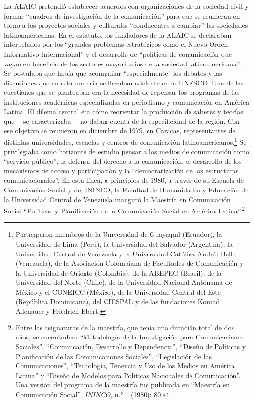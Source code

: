 \documentclass{tufte-handout}
\begin{document}
La ALAIC pretendió establecer acuerdos con organizaciones de la sociedad
civil y formar ``cuadros de investigación de la comunicación'' para que
se reunieran en torno a los proyectos sociales y culturales
``conducentes a cambiar'' las sociedades latinoamericanas. En el
estatuto, los fundadores de la ALAIC se declaraban interpelados por los
``grandes problemas estratégicos como el Nuevo Orden Informativo
Internacional'' y el desarrollo de ``políticas de comunicación que vayan
en beneficio de los sectores mayoritarios de la sociedad
latinoamericana''. Se postulaba que había que acompañar
``especialmente'' los debates y las discusiones que en esta materia se
llevaban adelante en la UNESCO. Una de las cuestiones que se planteaban
era la necesidad de repensar los programas de las instituciones
académicas especializadas en periodismo y comunicación en América
Latina. El dilema central era cómo reorientar la producción de saberes y
teorías que ---se caracterizaba--- no daban cuenta de la especificidad
de la región. Con ese objetivo se reunieron en diciembre de 1979, en
Caracas, representantes de distintas universidades, escuelas y centros
de comunicación latinoamericanos.\footnote{Participaron miembros de la
  Universidad de Guayaquil (Ecuador), la Universidad de Lima (Perú), la
  Universidad del Salvador (Argentina), la Universidad Central de
  Venezuela y la Universidad Católica Andrés Bello (Venezuela), de la
  Asociación Colombiana de Facultades de Comunicación y la Universidad
  de Oriente (Colombia), de la ABEPEC (Brasil), de la Universidad del
  Norte (Chile), de la Universidad Nacional Autónoma de México y el
  CONEICC (México), de la Universidad Central del Este (República
  Dominicana), del CIESPAL y de las fundaciones Konrad Adenauer y
  Friedrich Ebert.} Se privilegiaba como horizonte de estudio pensar a
los medios de comunicación como ``servicio público'', la defensa del
derecho a la comunicación, el desarrollo de los mecanismos de acceso y
participación y la ``democratización de las estructuras
comunicacionales''. En esta línea, a principios de 1980, a través de su
Escuela de Comunicación Social y del ININCO, la Facultad de Humanidades
y Educación de la Universidad Central de Venezuela inauguró la Maestría
en Comunicación Social ``Políticas y Planificación de la Comunicación
Social en América Latina''.\footnote{Entre las asignaturas de la
  maestría, que tenía una duración total de dos años, se encontraban
  ``Metodología de la Investigación para Comunicaciones Sociales'',
  ``Comunicación, Desarrollo y Dependencia'', ``Diseño de Políticas y
  Planificación de las Comunicaciones Sociales'', ``Legislación de las
  Comunicaciones'', ``Tecnología, Tenencia y Uso de los Medios en
  América Latina'' y ``Diseño de Modelos para Políticas Nacionales de
  Comunicación''. Una versión del programa de la maestría fue publicada
  en ``Maestría en Comunicación Social'', \emph{ININCO}, n.° 1 (1980):
  80.}
\end{document}
